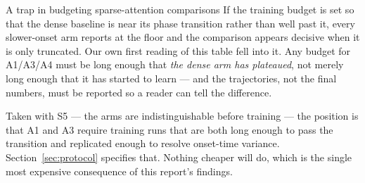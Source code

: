 \begin{revision}{A trap in budgeting sparse-attention comparisons}
If the training budget is set so that the dense baseline is near its phase transition rather than well past it, every slower-onset arm reports at the floor and the comparison appears decisive when it is only truncated. Our own first reading of this table fell into it. Any budget for A1/A3/A4 must be long enough that \emph{the dense arm has plateaued}, not merely long enough that it has started to learn --- and the trajectories, not the final numbers, must be reported so a reader can tell the difference.
\end{revision}

Taken with S5 --- the arms are indistinguishable before training --- the position is that A1 and A3 require training runs that are both long enough to pass the transition and replicated enough to resolve onset-time variance. Section~\ref{sec:protocol} specifies that. Nothing cheaper will do, which is the single most expensive consequence of this report's findings.
